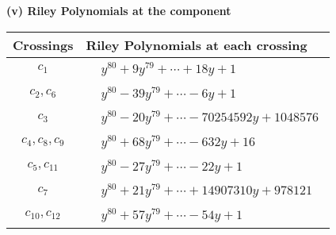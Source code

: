 \documentclass[1p]{elsarticle_modified}
\theoremstyle{definition}
\begin{document}
\flushleft \textbf{(v) Riley Polynomials at the component}\newline \\
\begin{tabular}{m{50pt}|m{274pt}}
Crossings & \hspace{64pt}Riley Polynomials at each crossing \\
\hline $$\begin{aligned}c_{1}\end{aligned}$$&$\begin{aligned}
&y^{80}+9 y^{79}+\cdots+18 y+1
\end{aligned}$\\
\hline $$\begin{aligned}c_{2},c_{6}\end{aligned}$$&$\begin{aligned}
&y^{80}-39 y^{79}+\cdots-6 y+1
\end{aligned}$\\
\hline $$\begin{aligned}c_{3}\end{aligned}$$&$\begin{aligned}
&y^{80}-20 y^{79}+\cdots-70254592 y+1048576
\end{aligned}$\\
\hline $$\begin{aligned}c_{4},c_{8},c_{9}\end{aligned}$$&$\begin{aligned}
&y^{80}+68 y^{79}+\cdots-632 y+16
\end{aligned}$\\
\hline $$\begin{aligned}c_{5},c_{11}\end{aligned}$$&$\begin{aligned}
&y^{80}-27 y^{79}+\cdots-22 y+1
\end{aligned}$\\
\hline $$\begin{aligned}c_{7}\end{aligned}$$&$\begin{aligned}
&y^{80}+21 y^{79}+\cdots+14907310 y+978121
\end{aligned}$\\
\hline $$\begin{aligned}c_{10},c_{12}\end{aligned}$$&$\begin{aligned}
&y^{80}+57 y^{79}+\cdots-54 y+1
\end{aligned}$\\
\hline
\end{tabular}\\~\\
\end{document}
